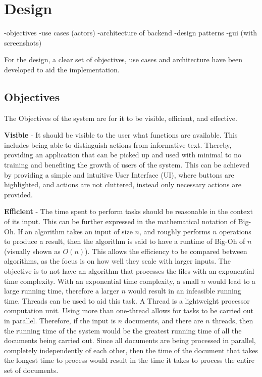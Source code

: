 \chapter{Design}
-objectives
-use cases (actors)
-architecture of backend
-design patterns
-gui (with screenshots)
\par For the design, a clear set of objectives, use cases and architecture have been developed to aid the implementation.
\section{Objectives}
\par The Objectives of the system are for it to be visible, efficient, and effective.
\par \textbf{Visible} -  It should be visible to the user what  functions are available. This includes being able to distinguish actions from informative text. Thereby, providing an application that can be picked up and used with minimal to no training and benefiting the growth of users of the system. This can be achieved by providing a simple and intuitive User Interface (UI), where buttons are highlighted, and actions are not cluttered, instead only necessary actions are provided. 

\par \textbf{Efficient} - The time spent to perform tasks should be reasonable in the context of its input. This can be further expressed in the mathematical notation of Big-Oh. If an algorithm takes an input of size $n$, and roughly performs $n$ operations to produce a result, then the algorithm is said to have a runtime of Big-Oh of $n$ (visually shown as $O(n)$). This allows the efficiency to be compared between algorithms, as the focus is on how well they scale with larger inputs. The objective is to not have an algorithm that processes the files with an exponential time complexity. With an exponential time complexity, a small $n$ would lead to a large running time, therefore a larger $n$ would result in an infeasible running time. Threads can be used to aid this task. A Thread is a lightweight processor computation unit. Using more than one-thread allows for tasks to be carried out in parallel. Therefore, if the input is $n$ documents, and there are $n$ threads, then the running time of the system would be the greatest running time of all the documents being carried out. Since all documents are being processed in parallel, completely independently of each other, then the time of the document that takes the longest time to process would result in the time it takes to process the entire set of documents.


